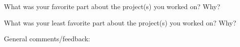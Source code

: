 \documentclass[12pt]{article}
\begin{document}
\begin{exam}{}
\newpage
\begin{problem}
What was your favorite part about the project(s) you worked on? Why?
\end{problem}
\vspace{2.75in}

\begin{problem}
What was your least favorite part about the project(s) you worked on? Why?
\end{problem}
\vspace{2.75in}

\begin{problem}
General comments/feedback:
\end{problem}

\end{exam}
\end{document}
